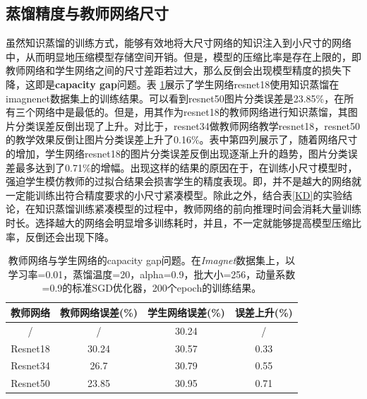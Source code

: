 \subsection{蒸馏精度与教师网络尺寸}
\label{m2}
虽然知识蒸馏的训练方式，能够有效地将大尺寸网络的知识注入到小尺寸的网络中，从而明显地压缩模型存储空间开销。但是，模型的压缩比率是存在上限的，即教师网络和学生网络之间的尺寸差距若过大，那么反倒会出现模型精度的损失下降，这即是\textbf{capacity gap}\cite{gou2021knowledge,guo2020reducing}问题。表 \ref{gap}展示了学生网络resnet18使用知识蒸馏在imagnenet数据集上的训练结果。可以看到resnet50图片分类误差是23.85\%，在所有三个网络中是最低的。但是，用其作为resnet18的教师网络进行知识蒸馏，其图片分类误差反倒出现了上升。对比于，resnet34做教师网络教学resnet18，resnet50的教学效果反倒让图片分类误差上升了0.16\%。表中第四列展示了，随着网络尺寸的增加，学生网络resnet18的图片分类误差反倒出现逐渐上升的趋势，图片分类误差最多达到了0.71\%的增幅。出现这样的结果的原因在于，在训练小尺寸模型时，强迫学生模仿教师的过拟合结果会损害学生的精度表现。即，并不是越大的网络就一定能训练出符合精度要求的小尺寸紧凑模型。除此之外，结合表\ref{KD}的实验结论，在知识蒸馏训练紧凑模型的过程中，教师网络的前向推理时间会消耗大量训练时长。选择越大的网络会明显增多训练耗时，并且，不一定就能够提高模型压缩比率，反倒还会出现下降。
\begin{table}[]
	\begin{tabular}{cccc}

		\hline
		\caption{教师网络与学生网络的capacity gap\cite{gou2021knowledge,guo2020reducing}问题。在\emph{Imagnet}数据集上，以学习率=0.01，蒸馏温度=20，alpha=0.9，批大小=256，动量系数=0.9的标准SGD优化器，200个epoch的训练结果\cite{cho2019efficacy}。}
		\label{gap}
		\textbf{教师网络} &\textbf{教师网络误差(\%)} &\textbf{学生网络误差(\%)}   &\textbf{误差上升(\%)}\\ \hline
		/                          & /                               & 30.24    & /                       \\ 
		Resnet18                   & 30.24                           & 30.57    & 0.33                      \\ 
		Resnet34                   & 26.7                            & 30.79    & 0.55                      \\ 
		Resnet50                   & 23.85                           & 30.95    & 0.71                \\ \hline
	\end{tabular}
\end{table}

